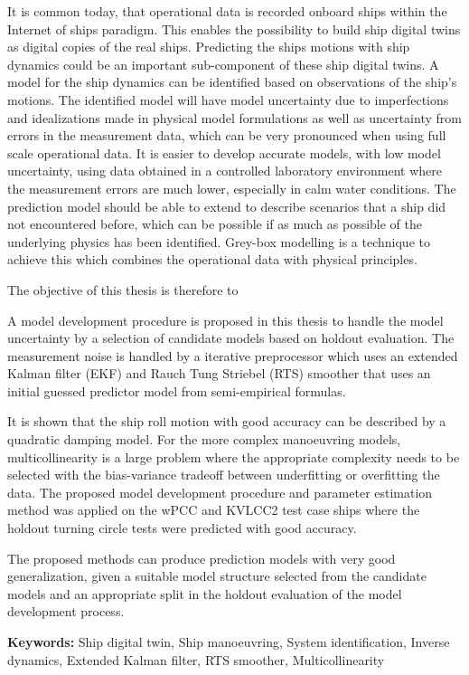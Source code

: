 
It is common today, that operational data is recorded onboard ships within the Internet of ships paradigm. This enables the possibility to build ship digital twins as digital copies of the real ships. Predicting the ships motions with ship dynamics could be an important sub-component of these ship digital twins. A model for the ship dynamics can be identified based on observations of the ship's motions. 
The identified model will have model uncertainty due to imperfections and idealizations made in physical model formulations as well as uncertainty from errors in the measurement data, which can be very pronounced when using full scale operational data. It is easier to develop accurate models, with low model uncertainty, using data obtained in a controlled laboratory environment where the measurement errors are much lower, especially in calm water conditions. The prediction model should be able to extend to describe scenarios that a ship did not encountered before, which can be possible if as much as possible of the underlying physics has been identified. Grey-box modelling is a technique to achieve this which combines the operational data with physical principles.  
 
The objective of this thesis is therefore to 
\noindent \objective 

A model development procedure is proposed in this thesis to handle the model uncertainty by a selection of candidate models based on holdout evaluation. The measurement noise is handled by a iterative preprocessor which uses an extended Kalman filter (EKF) and Rauch Tung Striebel (RTS) smoother that uses an initial guessed predictor model from semi-empirical formulas.

It is shown that the ship roll motion with good accuracy can be described by a quadratic damping model. For the more complex manoeuvring models, multicollinearity is a large problem where the appropriate complexity needs to be selected with the bias-variance tradeoff between underfitting or overfitting the data. 
The proposed model development procedure and parameter estimation method was applied on the wPCC and KVLCC2 test case ships where the holdout turning circle tests were predicted with good accuracy.

The proposed methods can produce prediction models with very good generalization, given a suitable model structure selected from the candidate models and an appropriate split in the holdout evaluation of the model development process. 

\vspace{0.1cm}
\textbf{Keywords:} Ship digital twin, Ship manoeuvring, System identification, Inverse dynamics, Extended Kalman filter, RTS smoother, Multicollinearity
